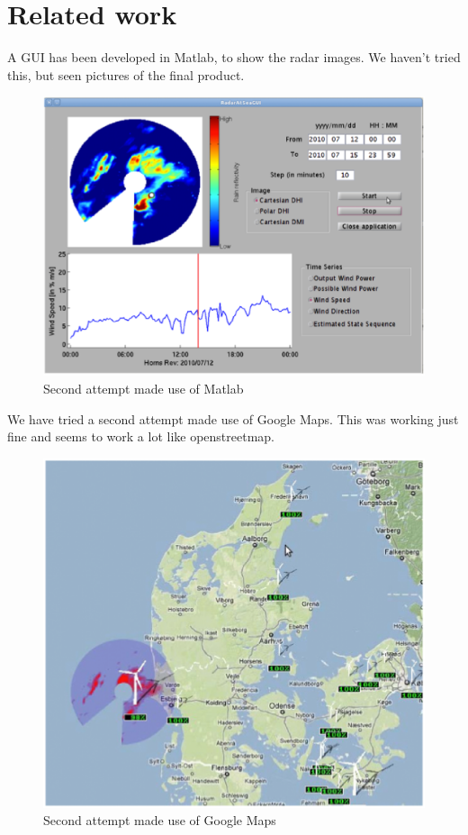 \chapter{Related work}
A GUI has been developed in Matlab, to show the radar images. We haven't tried this, but seen pictures of the final product.
\begin{figure}[htbp]
   \centering
   \includegraphics[scale=.3]{figure/matlab_gui.eps}
   \caption{Second attempt made use of Matlab}
\end{figure}

We have tried a second attempt made use of Google Maps. This was working just fine and seems to work a lot like openstreetmap.
\begin{figure}[htbp]
   \centering
   \includegraphics[scale=.3]{figure/googlemaps_gui.eps}
   \caption{Second attempt made use of Google Maps}
\end{figure}